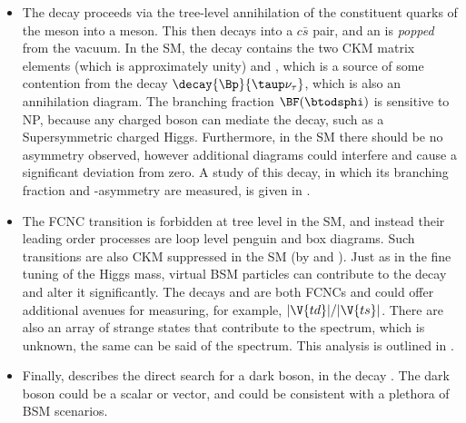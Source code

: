     \begin{itemize}
      \item
        The decay \btodsphi proceeds via the tree-level annihilation of the constituent quarks of the \Bp
        meson into a \Wp meson.
        This then decays into a $c\bar s$ pair, and an \ssbar is \emph{popped} from the vacuum.
        In the SM, the decay contains the two CKM matrix elements  (which is approximately unity) and
        , which is a source of some contention from the decay $\decay{\Bp}{\taup\nu_\tau}$, which
        is also an annihilation diagram.
        The branching fraction $\BF(\btodsphi)$ is sensitive to NP, because any charged boson can mediate
        the decay, such as a Supersymmetric charged Higgs.
        Furthermore, in the SM there should be no \CP asymmetry observed, however additional diagrams could
        interfere and cause a significant deviation from zero.
        A study of this decay, in which its branching fraction and \CP-asymmetry are measured, is given in
        .
      \item
        The FCNC transition  is forbidden at tree level in the SM, and instead their
        leading order processes are loop level penguin and box diagrams.
        Such transitions are also CKM suppressed in the SM (by  and ).
        Just as in the fine tuning of the Higgs mass, virtual BSM particles can contribute to the decay and
        alter it significantly.
        The decays \btokpipimumu and \btophikmumu are both  FCNCs and could offer
        additional avenues for measuring, for example, $|\V{td}|/|\V{ts}|$.
        There are also an array of strange states that contribute to the \kpipi spectrum, which is unknown,
        the same can be said of the \phik spectrum.
        This analysis is outlined in .
      \item
        Finally,  describes the direct search for a dark boson, \decay{\db}{\mumu} in the
        decay \decay{\Bd}{\Kstarent\mumu}.
        The dark boson could be a scalar or vector, and could be consistent with a plethora of BSM
        scenarios.
    \end{itemize}









